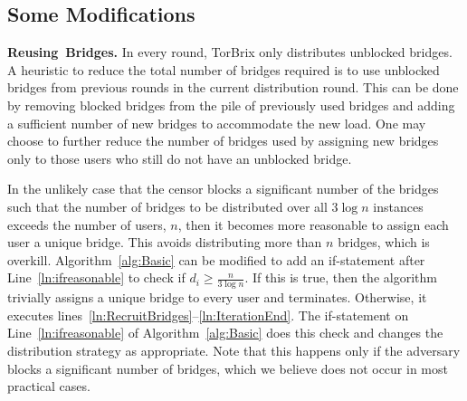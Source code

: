 \documentclass{llncs}
\newcommand{\fullpaper}[1]{#1}
\newcommand{\fullpaper}[1]{}
\newcommand{\sfsize}{\fontsize{0.73\baselineskip}{0.73\baselineskip}\selectfont}
\newcommand{\sans}[1]{\textsf{\sfsize \mbox{#1}}}
\newcommand{\sansb}[1]{\textbf{\sans{\mbox{#1}}}}
\newcommand{\para}[1]{\vspace{0.55em} \noindent \sansb{{\mbox{#1}}}}
\newcommand{\brix}{\sans{TorBrix}\xspace}
\begin{document}
\subsection{Some Modifications}

\para{Reusing Bridges.}
In every round, \brix only distributes unblocked bridges. A heuristic to reduce the total number of bridges required is to use unblocked bridges from previous rounds in the current distribution round. This can be done by removing blocked bridges from the pile of previously used bridges and adding a sufficient number of new bridges to accommodate the new load. One may choose to further reduce the number of bridges used by assigning new bridges only to those users who still do not have an unblocked bridge. %


In the unlikely case that the censor blocks a significant number of the bridges such that the number of bridges to be distributed over all $3\log{n}$ instances exceeds the number of users, $n$, then it becomes more reasonable to assign each user a unique bridge. This avoids distributing more than $n$ bridges, which is overkill. Algorithm~\ref{alg:Basic} can be modified to add an if-statement after Line~\ref{ln:ifreasonable} to check if ${d_i \geq \frac{n}{3\log{n}}}$. If this is true, then the algorithm trivially assigns a unique bridge to every user and terminates. Otherwise, it executes lines~\ref{ln:RecruitBridges}--\ref{ln:IterationEnd}.
The if-statement on Line~\ref{ln:ifreasonable} of Algorithm~\ref{alg:Basic} does this check and changes the distribution strategy as appropriate. Note that this happens only if the adversary blocks a significant number of bridges, which we believe does not occur in most practical cases. %
\end{document}
